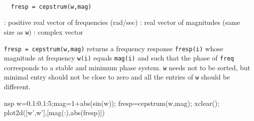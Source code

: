 
\begin{mandesc}
   \\ %
\end{mandesc}
\begin{calling_sequence}
\begin{verbatim}
  fresp = cepstrum(w,mag)  
\end{verbatim}
\end{calling_sequence}
\begin{parameters}
  \begin{varlist}
    : positive real vector of frequencies (rad/sec)
    : real vector of magnitudes (same size as \verb!w!)
    : complex vector
  \end{varlist}
\end{parameters}
\begin{mandescription}
  \verb!fresp = cepstrum(w,mag)! returns a frequency response \verb!fresp(i)!
  whose magnitude at frequency \verb!w(i)! equals \verb!mag(i)!  and such
  that the phase of \verb!freq! corresponds to a stable and minimum phase
  system. \verb!w! needs not to be sorted, but  minimal entry should not be
  close to zero and all the entries of \verb!w! should be different.
\end{mandescription}
\begin{examples}
  \begin{mintednsp}{nsp}
    w=0.1:0.1:5;mag=1+abs(sin(w));
    fresp=cepstrum(w,mag);
    xclear();
    plot2d([w',w'],[mag(:),abs(fresp)])
  \end{mintednsp}
\end{examples}
\begin{manseealso}
\end{manseealso}
